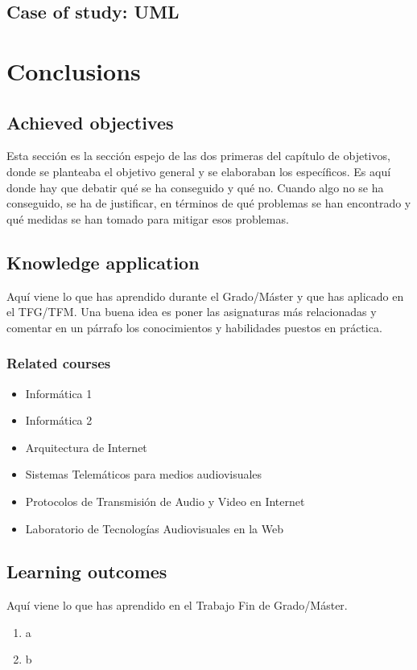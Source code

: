 \documentclass[a4paper, 12pt]{book}
\begin{document}
\section{Case of study: UML}
\label{sec:case-study-uml}
\cleardoublepage
\chapter{Conclusions}
\label{chap:conclusions}
\section{Achieved objectives}
\label{sec:achieved-objectives}
Esta sección es la sección espejo de las dos primeras del capítulo de objetivos,
donde se planteaba el objetivo general y se elaboraban los específicos.
Es aquí donde hay que debatir qué se ha conseguido y qué no. Cuando algo no
se ha conseguido, se ha de justificar, en términos de qué problemas se han
encontrado y qué medidas se han tomado para mitigar esos problemas.
\section{Knowledge application}
\label{sec:knowledge-application}
Aquí viene lo que has aprendido durante el Grado/Máster y que has aplicado
en el TFG/TFM. Una buena idea es poner las asignaturas más relacionadas y
comentar en un párrafo los conocimientos y habilidades puestos en práctica.
\subsection{Related courses}
\begin{itemize}
  \item Informática 1
  \item Informática 2
  \item Arquitectura de Internet
  \item Sistemas Telemáticos para medios audiovisuales
  \item Protocolos de Transmisión de Audio y Video en Internet
  \item Laboratorio de Tecnologías Audiovisuales en la Web
\end{itemize}
\section{Learning outcomes}
\label{sec:learning-outcomes}
Aquí viene lo que has aprendido en el Trabajo Fin de Grado/Máster.
\begin{enumerate}
  \item a
  \item b
\end{enumerate}
\end{document}

